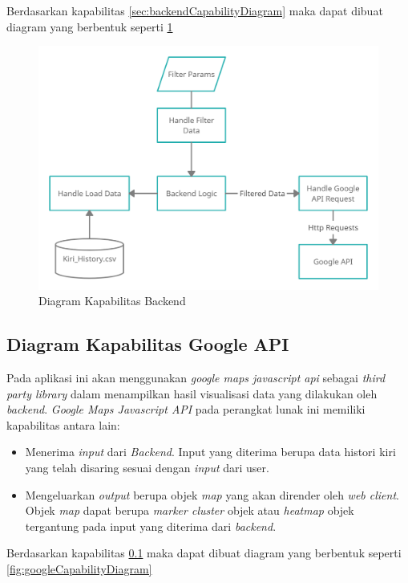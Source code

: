 Berdasarkan kapabilitas \ref{sec:backendCapabilityDiagram} maka dapat dibuat diagram yang berbentuk seperti \ref{fig:backendCapabilityDiagram}

\begin{figure}[H]
	\centering  
	\includegraphics[scale=0.25]{Gambar/Kiri_Backend_Capabilty.png}  
	\caption[Rancangan Diagram Kapabilitas]{Diagram Kapabilitas Backend} 
	\label{fig:backendCapabilityDiagram} 
\end{figure}

\subsection{Diagram Kapabilitas Google API}
\label{sec:googleCapabilityDiagram}
Pada aplikasi ini akan menggunakan \textit{google maps javascript api} sebagai \textit{third party library} dalam menampilkan hasil visualisasi data yang dilakukan oleh \textit{backend}. \textit{Google Maps Javascript API} pada perangkat lunak ini memiliki kapabilitas antara lain:
\begin{itemize}
    \item Menerima \textit{input} dari \textit{Backend}. Input yang diterima berupa data histori kiri yang telah disaring sesuai dengan  \textit{input} dari user.
    \item Mengeluarkan \textit{output} berupa objek \textit{map} yang akan dirender oleh \textit{web client}. Objek \textit{map} dapat berupa \textit{marker cluster} objek atau \textit{heatmap} objek tergantung pada input yang diterima dari \textit{backend}.
\end{itemize}
Berdasarkan kapabilitas \ref{sec:googleCapabilityDiagram} maka dapat dibuat diagram yang berbentuk seperti \ref{fig:googleCapabilityDiagram}

